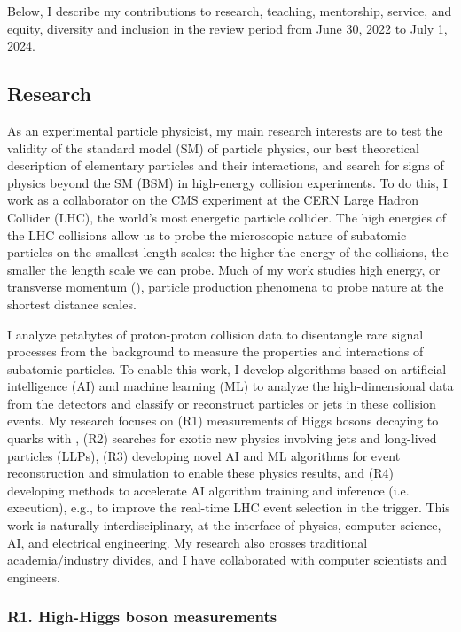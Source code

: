 \documentclass[11pt,letterpaper,notitlepage]{article}
\begin{document}
\pagestyle{fancyplain}

Below, I describe my contributions to research, teaching, mentorship, service, and equity, diversity and inclusion in the review period from June 30, 2022 to July 1, 2024.
\vspace{-1ex}
\subsection*{Research}

As an experimental particle physicist, my main research interests are to test the validity of the standard model (SM) of particle physics, our best theoretical description of elementary particles and their interactions, and search for signs of physics beyond the SM (BSM) in high-energy collision experiments.
To do this, I work as a collaborator on the CMS experiment at the CERN Large Hadron Collider (LHC), the world's most energetic particle collider.
The high energies of the LHC collisions allow us to probe the microscopic nature of subatomic particles on the smallest length scales: the higher the energy of the collisions, the smaller the length scale we can probe.
Much of my work studies high energy, or transverse momentum (\pt), particle production phenomena to probe nature at the shortest distance scales.

I analyze petabytes of proton-proton collision data to disentangle rare signal processes from the background to measure the properties and interactions of subatomic particles.
To enable this work, I develop algorithms based on artificial intelligence (AI) and machine learning (ML) to analyze the high-dimensional data from the detectors and classify or reconstruct particles or jets in these collision events.
My research focuses on
(R1) measurements of Higgs bosons decaying to quarks with \pt,
(R2) searches for exotic new physics involving jets and long-lived particles (LLPs),
(R3) developing novel AI and ML algorithms for event reconstruction and simulation to enable these physics results, and
(R4) developing methods to accelerate AI algorithm training and inference (i.e. execution), e.g., to improve the real-time LHC event selection in the trigger.
This work is naturally interdisciplinary, at the interface of physics, computer science, AI, and electrical engineering.
My research also crosses traditional academia/industry divides, and I have collaborated with computer scientists and engineers.

\vspace{-1ex}
\subsubsection*{R1. High-\pt Higgs boson measurements}
\end{document}

